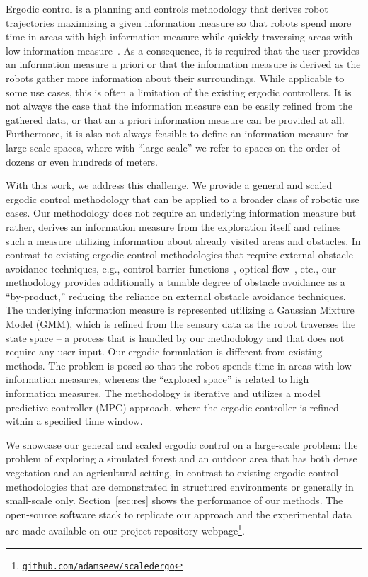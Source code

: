 \documentclass[letterpaper,10pt,conference,twoside]{IEEEtran}
\theoremstyle{definition}
\begin{document}
Ergodic control is a planning and controls methodology that derives robot trajectories maximizing a given information measure so that robots spend more time in areas with high information measure while quickly traversing areas with low information measure~\cite{mathew2011metrics,abraham2017ergodic,miller2013trajectory}. As a consequence, it is required that the user provides an information measure a priori or that the information measure is derived as the robots gather more information about their surroundings. While applicable to some use cases, this is often a limitation of the existing ergodic controllers. It is not always the case that the information measure can be easily refined from the gathered data, or that an a priori information measure can be provided at all. Furthermore, it is also not always feasible to define an information measure for large-scale spaces, %
where with ``large-scale'' we refer to spaces on the order of dozens or even hundreds of meters. 

With this work, we address this challenge. We provide a general and scaled ergodic control methodology that can be applied to a broader class of robotic use cases. Our methodology does not require an underlying information measure but rather, derives an information measure from the exploration itself and refines such a measure utilizing information about already visited areas and obstacles. %
In contrast to existing ergodic control methodologies that require external obstacle avoidance techniques, e.g., control barrier functions~\cite{lerch2023safety}, optical flow~\cite{prabhakar2020ergodic}, etc., our methodology provides additionally a tunable degree of obstacle avoidance as a ``by-product,'' reducing the reliance on external obstacle avoidance techniques.  
%
The underlying information measure is represented utilizing a Gaussian Mixture Model (GMM), which is refined from the sensory data as the robot traverses the state space -- a process that is handled by our methodology and that does not require any user input. Our ergodic formulation is different from existing methods. The problem is posed so that the robot spends time in areas with low information measures, whereas the ``explored space'' is related to high information measures. The methodology is iterative and utilizes a model predictive controller (MPC) approach, where the ergodic controller is refined within a specified time window.

\IEEEpubidadjcol
We showcase our general and scaled ergodic control on a large-scale problem: the problem of exploring a simulated forest and an outdoor area that has both dense vegetation and an agricultural setting, in contrast to existing ergodic control methodologies that are demonstrated in structured environments or generally in small-scale only. Section~\ref{sec:res} shows the performance of our methods. The open-source software stack to replicate our approach and the experimental data are made available on our project repository webpage\footnote{\href{https://github.com/adamseew/scaledergo}{\tt github.com/adamseew/scaledergo}}.
\end{document}
